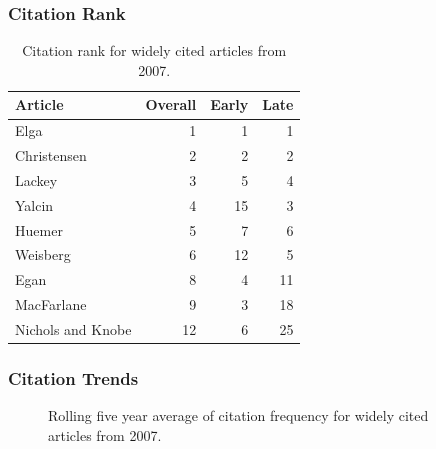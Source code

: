 \documentclass[
  10pt,
  letterpaper,
  DIV=11,
  numbers=noendperiod,
  twoside]{scrartcl}
\begin{document}
\subsubsection*{Citation Rank}\label{sec-rank-2007}

\begin{longtable}[]{@{}lrrr@{}}

\caption{\label{tbl-citation-rank-2007}Citation rank for widely cited
articles from 2007.}

\tabularnewline

\toprule\noalign{}
Article & Overall & Early & Late \\
\midrule\noalign{}
\endhead
\bottomrule\noalign{}
\endlastfoot
Elga & 1 & 1 & 1 \\
Christensen & 2 & 2 & 2 \\
Lackey & 3 & 5 & 4 \\
Yalcin & 4 & 15 & 3 \\
Huemer & 5 & 7 & 6 \\
Weisberg & 6 & 12 & 5 \\
Egan & 8 & 4 & 11 \\
MacFarlane & 9 & 3 & 18 \\
Nichols and Knobe & 12 & 6 & 25 \\

\end{longtable}

\subsubsection*{Citation Trends}\label{sec-trends-2007}

\begin{figure}


\caption{\label{fig-citation-spaghetti-2007}Rolling five year average of
citation frequency for widely cited articles from 2007.}

\end{figure}%
\end{document}
